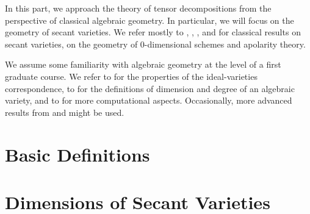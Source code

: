 In this part, we approach the theory of tensor decompositions from the perspective of classical algebraic geometry. In particular, we will focus on the geometry of secant varieties. We refer mostly to \cite{Zak93}, \cite{IK99}, \cite{CGO14}, \cite{Rus16} and \cite{BCCGO18} for classical results on secant varieties, on the geometry of $0$-dimensional schemes and apolarity theory. 

We assume some familiarity with algebraic geometry at the level of a first graduate course. We refer to \cite{Sha94} for the properties of the ideal-varieties correspondence, to \cite{Har92} for the definitions of dimension and degree of an algebraic variety, and to \cite{CLO07} for more computational aspects. Occasionally, more advanced results from \cite{Mum76} and \cite{Vak24} might be used. 

\chapter{Basic Definitions}
\label{geometrySecants-chapter-BasicDefinitions}


\chapter{Dimensions of Secant Varieties}
\label{geometrySecants-chapter-DimensionsSecants}


% 
% 
% 
% 
% 


% 


